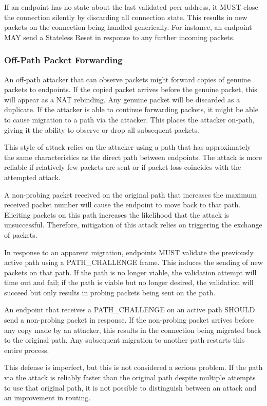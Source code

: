\documentclass{article}
\begin{document}
If an endpoint has no state about the last validated peer address, it MUST close the connection silently by discarding all connection state.  This results in new packets on the connection being handled generically.  For instance, an endpoint MAY send a Stateless Reset in response to any further incoming packets.

\subsubsection{Off-Path Packet Forwarding}

An off-path attacker that can observe packets might forward copies of genuine packets to endpoints.  If the copied packet arrives before the genuine packet, this will appear as a NAT rebinding.  Any genuine packet will be discarded as a duplicate.  If the attacker is able to continue forwarding packets, it might be able to cause migration to a path via the attacker.  This places the attacker on-path, giving it the ability to observe or drop all subsequent packets.

This style of attack relies on the attacker using a path that has approximately the same characteristics as the direct path between endpoints.  The attack is more reliable if relatively few packets are sent or if packet loss coincides with the attempted attack.

A non-probing packet received on the original path that increases the maximum received packet number will cause the endpoint to move back to that path.  Eliciting packets on this path increases the likelihood that the attack is unsuccessful.  Therefore, mitigation of this attack relies on triggering the exchange of packets.

In response to an apparent migration, endpoints MUST validate the previously active path using a PATH\_CHALLENGE frame.  This induces the sending of new packets on that path.  If the path is no longer viable, the validation attempt will time out and fail; if the path is viable but no longer desired, the validation will succeed but only results in probing packets being sent on the path.

An endpoint that receives a PATH\_CHALLENGE on an active path SHOULD send a non-probing packet in response.  If the non-probing packet arrives before any copy made by an attacker, this results in the connection being migrated back to the original path.  Any subsequent migration to another path restarts this entire process.

This defense is imperfect, but this is not considered a serious problem.  If the path via the attack is reliably faster than the original path despite multiple attempts to use that original path, it is not possible to distinguish between an attack and an improvement in routing.
\end{document}
